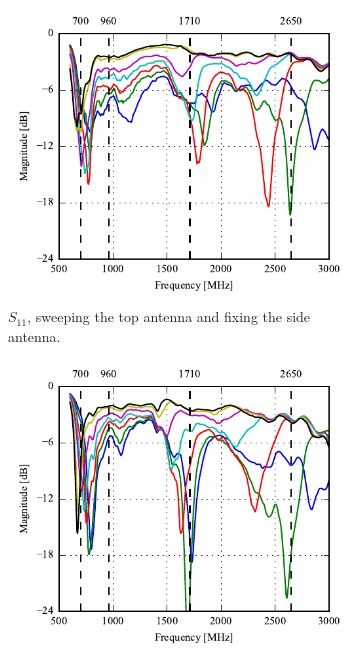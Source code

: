 \begin{figure}[htbp]
    \centering
    \begin{subfigure}{0.49\linewidth}
        \centering
        \includegraphics{img/tech_sol/trianglefeed/mockup/sweep_s11_csh1.pdf}
        \caption{$S_{11}$, sweeping the top antenna and fixing the side antenna.}
    \end{subfigure}
    \hfill
    \begin{subfigure}{0.49\linewidth}
        \centering
        \includegraphics{img/tech_sol/trianglefeed/mockup/sweep_s22_csh2.pdf}

\end{subfigure}
\end{figure}
